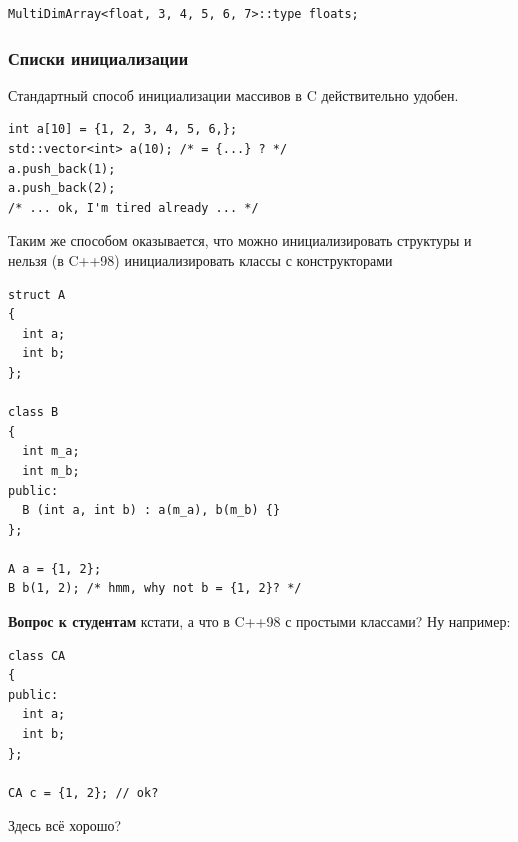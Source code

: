 \documentclass[a4paper,12pt,oneside]{article}
\newif\ifanswers
\begin{document}
\begin{lstlisting}
MultiDimArray<float, 3, 4, 5, 6, 7>::type floats;
\end{lstlisting}

\ifanswers
Правильный ответ: да и даже не так сложно

\begin{lstlisting}
template <class T, size_t I, size_t... J>
struct MultiDimArray 
{
  using Nested = typename MultiDimArray<T, J...>::type;
  using type = std::array<Nested, I>;
};
 
template <class T, size_t I>
struct MultiDimArray<T, I> 
{
  using type = std::array<T, I>;
};
\end{lstlisting}

К этому моменту курса это должно стать обычной задачей на вариабельные шаблоны.
\fi

\subsubsection{Списки инициализации}

Стандартный способ инициализации массивов в C действительно удобен.

\begin{lstlisting}
int a[10] = {1, 2, 3, 4, 5, 6,};
std::vector<int> a(10); /* = {...} ? */
a.push_back(1);
a.push_back(2);
/* ... ok, I'm tired already ... */
\end{lstlisting}

Таким же способом оказывается, что можно инициализировать структуры и нельзя (в C++98) инициализировать классы с конструкторами

\begin{lstlisting}
struct A
{
  int a;
  int b;
};

class B
{
  int m_a;
  int m_b;
public:
  B (int a, int b) : a(m_a), b(m_b) {} 
};

A a = {1, 2};
B b(1, 2); /* hmm, why not b = {1, 2}? */
\end{lstlisting}

\textbf{Вопрос к студентам} кстати, а что в C++98 с простыми классами? Ну например:
\begin{lstlisting}
class CA
{
public:
  int a;
  int b;
};

CA c = {1, 2}; // ok?
\end{lstlisting}

Здесь всё хорошо?

\ifanswers
Ответ: да, это всё ещё POD класс и здесь всё хорошо.
\fi
\end{document}
